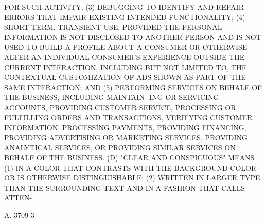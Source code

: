  FOR SUCH ACTIVITY;
   (3) DEBUGGING TO IDENTIFY  AND  REPAIR  ERRORS  THAT  IMPAIR  EXISTING
 INTENDED FUNCTIONALITY;
   (4)  SHORT-TERM,  TRANSIENT  USE, PROVIDED THE PERSONAL INFORMATION IS
 NOT DISCLOSED TO ANOTHER PERSON AND IS NOT USED TO BUILD A PROFILE ABOUT
 A CONSUMER  OR  OTHERWISE  ALTER  AN  INDIVIDUAL  CONSUMER'S  EXPERIENCE
 OUTSIDE  THE  CURRENT  INTERACTION,  INCLUDING  BUT  NOT LIMITED TO, THE
 CONTEXTUAL CUSTOMIZATION OF ADS SHOWN AS PART OF THE  SAME  INTERACTION;
 AND
   (5) PERFORMING SERVICES ON BEHALF OF THE BUSINESS, INCLUDING MAINTAIN-
 ING  OR  SERVICING  ACCOUNTS,  PROVIDING CUSTOMER SERVICE, PROCESSING OR
 FULFILLING ORDERS  AND  TRANSACTIONS,  VERIFYING  CUSTOMER  INFORMATION,
 PROCESSING  PAYMENTS,  PROVIDING  FINANCING,  PROVIDING  ADVERTISING  OR
 MARKETING SERVICES, PROVIDING ANALYTICAL SERVICES, OR PROVIDING  SIMILAR
 SERVICES ON BEHALF OF THE BUSINESS.
   (D)  "CLEAR  AND CONSPICUOUS" MEANS (1) IN A COLOR THAT CONTRASTS WITH
 THE BACKGROUND COLOR OR IS OTHERWISE  DISTINGUISHABLE;  (2)  WRITTEN  IN
 LARGER TYPE THAN THE SURROUNDING TEXT AND IN A FASHION THAT CALLS ATTEN-

 A. 3709                             3
 
